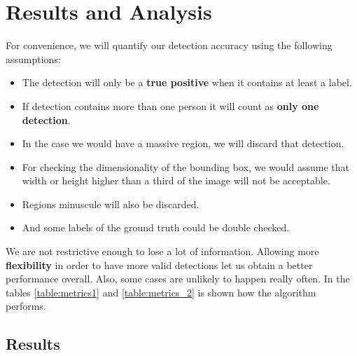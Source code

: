 \documentclass[10pt]{article}
\begin{document}

\section{Results and Analysis}

For convenience, we will quantify our detection accuracy using the following assumptions:

\begin{itemize}
  \item The detection will only be a \textbf{true positive} when it contains at least a label.
  \item If detection contains more than one person it will count as \textbf{only one detection}.
  \item In the case we would have a massive region, we will discard that detection.
  \item For checking the dimensionality of the bounding box, we would assume that width or height higher than a third of the image will not be acceptable.
  \item Regions minuscule will also be discarded.
  \item And some labels of the ground truth could be double checked.
\end{itemize}

We are not restrictive enough to lose a lot of information. Allowing more \textbf{flexibility} in order to have more valid detections let us obtain a better performance overall. Also, some cases are unlikely to happen really often. In the tables \ref{table:metrics1} and \ref{table:metrics_2} is shown how the algorithm performs.

\subsection*{Results}
\end{document}
